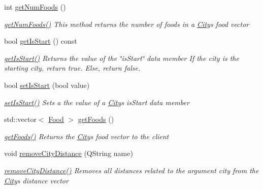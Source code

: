 \begin{DoxyCompactItemize}
int \mbox{\hyperlink{class_city_a1462a90a0d40e0d946903b1db214da0e}{get\+Num\+Foods}} ()
\begin{DoxyCompactList}\small\item\em \mbox{\hyperlink{class_city_a1462a90a0d40e0d946903b1db214da0e}{get\+Num\+Foods()}} This method returns the number of foods in a \mbox{\hyperlink{class_city}{City}}\textquotesingle{}s food vector \end{DoxyCompactList}\item 
bool \mbox{\hyperlink{class_city_ae817fa08cc2191da09c91c3d6b4069d5}{get\+Is\+Start}} () const
\begin{DoxyCompactList}\small\item\em \mbox{\hyperlink{class_city_ae817fa08cc2191da09c91c3d6b4069d5}{get\+Is\+Start()}} Returns the value of the \char`\"{}is\+Start\char`\"{} data member If the city is the starting city, return true. Else, return false. \end{DoxyCompactList}\item 
bool \mbox{\hyperlink{class_city_a9fcdb0c59ac7760dd3996803ddb6bf86}{set\+Is\+Start}} (bool value)
\begin{DoxyCompactList}\small\item\em \mbox{\hyperlink{class_city_a9fcdb0c59ac7760dd3996803ddb6bf86}{set\+Is\+Start()}} Sets a the value of a \mbox{\hyperlink{class_city}{City}}\textquotesingle{}s is\+Start data member \end{DoxyCompactList}\item 
std\+::vector$<$ \mbox{\hyperlink{class_food}{Food}} $>$ \mbox{\hyperlink{class_city_abbfdb9d3dba484ee8f9daee6ef03cd97}{get\+Foods}} ()
\begin{DoxyCompactList}\small\item\em \mbox{\hyperlink{class_city_abbfdb9d3dba484ee8f9daee6ef03cd97}{get\+Foods()}} Returns the \mbox{\hyperlink{class_city}{City}}\textquotesingle{}s food vector to the client \end{DoxyCompactList}\item 
void \mbox{\hyperlink{class_city_ac4829f9fc09b4c0f4cf2f7453c974264}{remove\+City\+Distance}} (Q\+String name)
\begin{DoxyCompactList}\small\item\em \mbox{\hyperlink{class_city_ac4829f9fc09b4c0f4cf2f7453c974264}{remove\+City\+Distance()}} Removes all distances related to the argument city from the \mbox{\hyperlink{class_city}{City}}\textquotesingle{}s distance vector \end{DoxyCompactList}\item 

\end{DoxyCompactItemize}
